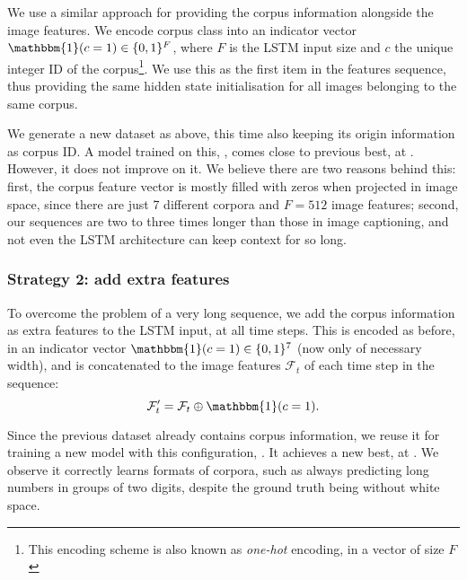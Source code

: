 			We use a similar approach for providing the corpus information alongside the image features. We encode corpus class into an indicator vector \(\mathbbm{1}(c = 1) \in \{0, 1\}^F\), where \(F\) is the LSTM input size and \(c\) the unique integer ID of the corpus\footnote{This encoding scheme is also known as \emph{one-hot} encoding, in a vector of size \(F\)}. We use this as the first item in the features sequence, thus providing the same hidden state initialisation for all images belonging to the same corpus.

			We generate a new dataset as above, this time also keeping its origin information as corpus ID. A model trained on this, , comes close to previous best, at . However, it does not improve on it. We believe there are two reasons behind this: first, the corpus feature vector is mostly filled with zeros when projected in image space, since there are just 7 different corpora and \(F = 512\) image features; second, our sequences are two to three times longer than those in image captioning, and not even the LSTM architecture can keep context for so long.

		\subsubsection*{Strategy 2: add extra features}
			To overcome the problem of a very long sequence, we add the corpus information as extra features to the LSTM input, at all time steps. This is encoded as before, in an indicator vector \(\mathbbm{1}(c = 1) \in \{0,1\}^7\) (now only of necessary width), and is concatenated to the image features \(\mathcal{F}_t\) of each time step in the sequence:\[
				\mathcal{F}'_t = \mathcal{F}_t \oplus \mathbbm{1}(c = 1).
			\]

			Since the previous dataset already contains corpus information, we reuse it for training a new model with this configuration, . It achieves a new best, at . We observe it correctly learns formats of corpora, such as always predicting long numbers in groups of two digits, despite the ground truth being without white space.


